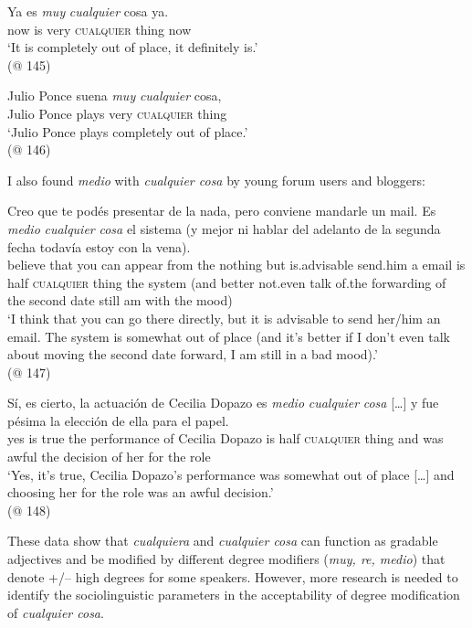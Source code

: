 \ea \label{ex:key:260} %
    \gll Ya es \textit{muy} \textit{cualquier} cosa ya.\\
    now is very \textsc{cualquier} thing now\\
    \glt ‘It is completely out of place, it definitely is.’\\
    (@ 145)
\z

\ea \label{ex:key:261} %
    \gll Julio Ponce suena \textit{muy} \textit{cualquier} cosa,\\
    Julio Ponce plays very \textsc{cualquier} thing\\
    \glt ‘Julio Ponce plays completely out of place.’\\
    (@ 146)
\z

I also found \textit{medio} with \textit{cualquier cosa} by young forum users and bloggers:

\ea \label{ex:key:262} %
    \gll Creo que te podés presentar de la nada, pero conviene mandarle un mail. Es \textit{medio} \textit{cualquier} \textit{cosa} {el} sistema (y mejor ni hablar  del adelanto de la segunda fecha todavía estoy con la vena).\\
    believe that you can appear from the nothing but is.advisable send.him a email is half \textsc{cualquier} thing the system (and better not.even talk of.the forwarding of the second date still am with the mood)\\
    \glt ‘I think that you can go there directly, but it is advisable to send her/him an email. The system is somewhat out of place (and it’s better if I don’t even talk about moving the second date forward, I am still in a bad mood).’\\
    (@ 147)
\z

\ea \label{ex:key:263} %
    \gll Sí, es cierto, la actuación de Cecilia Dopazo es \textit{medio} \textit{cualquier} \textit{cosa} […] y fue pésima la elección de ella para el papel.\\
    yes is true the performance of Cecilia Dopazo is half \textsc{cualquier} thing {} and was awful the decision of her for the role\\
    \glt ‘Yes, it’s true, Cecilia Dopazo’s performance was somewhat out of place […] and choosing her for the role was an awful decision.’\\
    (@ 148)
\z

These data show that \textit{cualquiera} and \textit{cualquier cosa} can function as gradable adjectives and be modified by different degree modifiers (\textit{muy, re, medio}) that denote +/– high degrees for some speakers. However, more research is needed to identify the sociolinguistic parameters in the acceptability of degree modification of \textit{cualquier cosa}.

